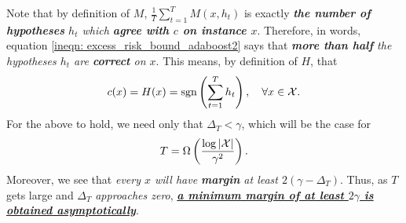 \documentclass[11pt]{article}
\begin{document}
\begin{itemize}
\begin{remark}
Note that by definition of $M$, $\frac{1}{T}\sum_{t=1}^{T}M(x, h_t)$ is exactly \emph{\textbf{the number of hypotheses} $h_t$ which \textbf{agree with $c$ on instance $x$}}. Therefore, in words, equation \eqref{ineqn: excess_risk_bound_adaboost2} says that \emph{\textbf{more than half} the hypotheses $h_t$ are \textbf{correct} on $x$}. This means, by definition of $H$, that 
\begin{align*}
c(x) = H(x) = \text{sgn}\left(\sum_{t=1}^{T}h_t\right), \quad \forall x\in {\mathcal X}.
\end{align*} For the above to hold, we need only that $\Delta_T < \gamma$, which will be the case for 
\begin{align*}
T = \Omega\left(\frac{\log \left\lvert {\mathcal X} \right\rvert}{\gamma^2}\right).
\end{align*} Moreover, we see that \emph{every $x$ will have \textbf{margin} at least $2(\gamma - \Delta_T)$}. Thus, as $T$ gets large and $\Delta_T$ \emph{approaches zero}, \emph{\textbf{\underline{a minimum margin of at least $2\gamma$ is obtained asymptotically}}}.
\end{remark}
\end{itemize}
\end{document}
